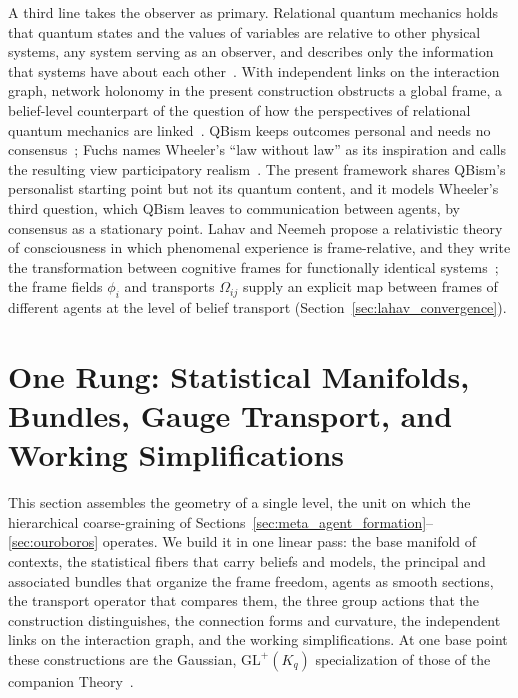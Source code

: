 \documentclass[11pt]{article}
\begin{document}
A third line takes the observer as primary. Relational quantum mechanics holds that quantum states and the values of variables are relative to other physical systems, any system serving as an observer, and describes only the information that systems have about each other~\cite{Rovelli1996}. With independent links on the interaction graph, network holonomy in the present construction obstructs a global frame, a belief-level counterpart of the question of how the perspectives of relational quantum mechanics are linked~\cite{AdlamRovelli2022}. QBism keeps outcomes personal and needs no consensus~\cite{Fuchs2014, DeBrotaFuchsSchack2020}; Fuchs names Wheeler's ``law without law'' as its inspiration and calls the resulting view participatory realism~\cite{Fuchs2017}. The present framework shares QBism's personalist starting point but not its quantum content, and it models Wheeler's third question, which QBism leaves to communication between agents, by consensus as a stationary point. Lahav and Neemeh propose a relativistic theory of consciousness in which phenomenal experience is frame-relative, and they write the transformation between cognitive frames for functionally identical systems~\cite{LahavNeemeh2022, LahavNeemeh2025}; the frame fields $\phi_i$ and transports $\Omega_{ij}$ supply an explicit map between frames of different agents at the level of belief transport (Section~\ref{sec:lahav_convergence}).

\section{One Rung: Statistical Manifolds, Bundles, Gauge Transport, and Working Simplifications}\label{sec:one_rung}

This section assembles the geometry of a single level, the unit on which the hierarchical coarse-graining of Sections~\ref{sec:meta_agent_formation}--\ref{sec:ouroboros} operates. We build it in one linear pass: the base manifold of contexts, the statistical fibers that carry beliefs and models, the principal and associated bundles that organize the frame freedom, agents as smooth sections, the transport operator that compares them, the three group actions that the construction distinguishes, the connection forms and curvature, the independent links on the interaction graph, and the working simplifications. At one base point these constructions are the Gaussian, $\mathrm{GL}^+(K_q)$ specialization of those of the companion Theory~\cite[Ch.~2]{DennisGaugeVFE2026}.
\end{document}
